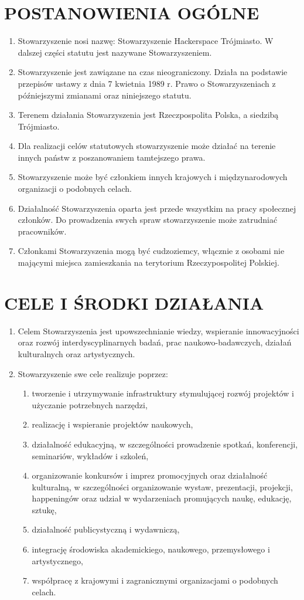 \documentclass{article}
\begin{document}
\section{POSTANOWIENIA OGÓLNE}
  \begin{enumerate}
    \item Stowarzyszenie nosi nazwę: Stowarzyszenie Hackerspace Trójmiasto. W dalszej części statutu jest nazywane Stowarzyszeniem.
    \item Stowarzyszenie jest zawiązane na czas nieograniczony. Działa na podstawie przepisów ustawy z dnia 7 kwietnia 1989 r. Prawo o Stowarzyszeniach z późniejszymi zmianami oraz niniejszego statutu.
    \item Terenem działania Stowarzyszenia jest Rzeczpospolita Polska, a siedzibą Trójmiasto.
    \item Dla realizacji celów statutowych stowarzyszenie może działać na terenie innych państw z poszanowaniem tamtejszego prawa.
    \item Stowarzyszenie może być członkiem innych krajowych i międzynarodowych organizacji o podobnych celach.
    \item Działalność Stowarzyszenia oparta jest przede wszystkim na pracy społecznej członków. Do prowadzenia swych spraw stowarzyszenie może zatrudniać pracowników.
    \item Członkami Stowarzyszenia mogą być cudzoziemcy, włącznie z osobami nie mającymi miejsca zamieszkania na terytorium Rzeczypospolitej Polskiej.
  \end{enumerate}
\section{CELE I ŚRODKI DZIAŁANIA}
  \begin{enumerate}
    \item Celem Stowarzyszenia jest upowszechnianie wiedzy, wspieranie innowacyjności oraz rozwój interdyscyplinarnych badań, prac naukowo-badawczych, działań kulturalnych oraz artystycznych.
    \item Stowarzyszenie swe cele realizuje poprzez:
      \begin{enumerate}
        \item tworzenie i utrzymywanie infrastruktury stymulującej rozwój projektów i użyczanie potrzebnych narzędzi,
        \item realizację i wspieranie projektów naukowych,
        \item działalność edukacyjną, w szczególności prowadzenie spotkań, konferencji, seminariów, wykładów i szkoleń,
        \item organizowanie konkursów i imprez promocyjnych oraz działalność kulturalną, w szczególności organizowanie wystaw, prezentacji, projekcji, happeningów oraz udział w wydarzeniach promujących naukę, edukację, sztukę,
        \item działalność publicystyczną i wydawniczą,
        \item integrację środowiska akademickiego, naukowego, przemysłowego i artystycznego,
        \item współpracę z krajowymi i zagranicznymi organizacjami o podobnych celach.
      \end{enumerate}
  \end{enumerate}
\end{document}
